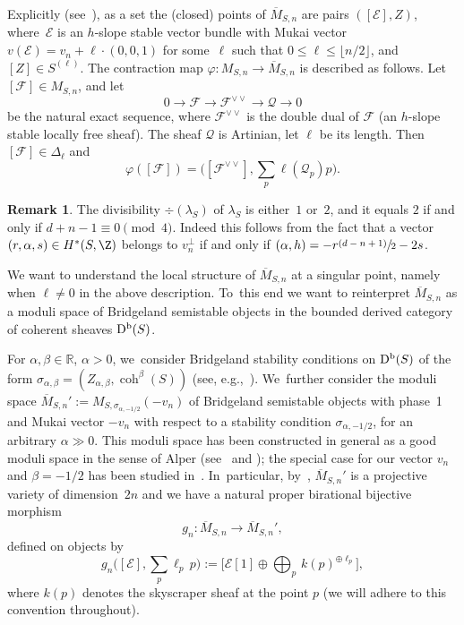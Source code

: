 \documentclass[JEP,XML,SOM,Unicode,published]{cedram}
\newcommand{\psfrac}[2]{\sfrac{(#1)}{#2}}
\newcommand{\RR}{{\mathbb R}}
\newcommand\cE{\mathcal{E}}
\newcommand\cF{\mathcal{F}}
\newcommand\cQ{\mathcal{Q}}
\DeclareMathOperator{\coh}{coh}
\DeclareMathOperator{\Db}{D^{\textup b}}
\let\phi\varphi
\theoremstyle{definition}
\newtheorem{rema}[lemm]{Remark}
\begin{document}
Explicitly (see~\cite{Li:uhlencomp}), as a set the (closed) points of $\overline{M}_{S,n}$ are pairs $([\cE],Z)$, where~$\cE$ is an $h$-slope stable vector bundle with Mukai vector $v(\cE)=v_n+\ell\cdot(0,0,1)$ for some~$\ell$ such that $0\le \ell\le \lfloor n/2\rfloor$, and $[Z]\in S^{(\ell)}$.
The contraction map $\phi\colon M_{S,n}\to \overline{M}_{S,n}$ is described as follows.
Let $[\cF]\in M_{S,n}$, and let
\[
0\to \cF\to \cF^{\vee\vee}\to \cQ\to 0
\]
be the natural exact sequence, where $\cF^{\vee\vee}$ is the double dual of $\cF$ (an $h$-slope stable locally free sheaf).
The sheaf $\cQ$ is Artinian, let $\ell$ be its length.
Then $[\cF]\in\Delta_{\ell}$ and
\[\textstyle
\varphi([\cF])=\bigl([\cF^{\vee\vee}],\sum_{p}\ell(\cQ_p)p\bigr).
\]

\begin{rema}\label{rmk:divisibility}
The divisibility $\div(\lambda_S)$ of $\lambda_S$ is either~$1$ or~$2$, and it equals $2$ if and only if $d+n-1\equiv 0 \pmod 4$.
Indeed this follows from the fact that a vector $(r,\alpha,s)\in H^*(S,\Z)$ belongs to $v_n^\perp$ if and only if $(\alpha,h)=-r\psfrac{d-n+1}{2}-2s$.
\end{rema}

We want to understand the local structure of $\overline{M}_{S,n}$ at a singular point, namely when $\ell\neq0$ in the above description. To~this end we want to reinterpret $\overline{M}_{S,n}$ as a moduli space of Bridgeland semistable objects in the bounded derived category of coherent sheaves $\Db(S)$.

For $\alpha,\beta\in\RR$, $\alpha>0$, we~consider Bridgeland stability conditions on $\Db(S)$ of the form $\sigma_{\alpha,\beta}=(Z_{\alpha,\beta},\coh^\beta(S))$ (see, e.g.,~\cite[Ex.\,3.7]{involutions1}). We~further consider the moduli space $\overline{M}{}_{S,n}':=M_{S,\sigma_{\alpha,-1/2}}(-v_n)$ of Bridgeland semistable objects with phase~1 and Mukai vector $-v_n$ with respect to a stability condition $\sigma_{\alpha,-1/2}$, for an arbitrary $\alpha\gg 0$.
This moduli space has been constructed in general as a good moduli space in the sense of Alper (see~\cite{Alper:GoodModuli,AHLH:Moduli} and \cite[Th.\,21.24]{BLMNPS:family}); the special case for our vector $v_n$ and $\beta=-1/2$ has been studied in~\cite{Tajakka:Uhlenbeck}. In~particular, by~\cite[Th.\,1.1]{Tajakka:Uhlenbeck}, $\overline{M}{}_{S,n}'$ is a projective variety of dimension~$2n$ and we have a natural proper birational bijective morphism
\[
g_n\colon \overline{M}_{S,n} \to \overline{M}{}_{S,n}',
\]
defined on objects by
\begin{equation}\label{eq:GiesekerToDUY}\textstyle
g_n\bigl([\cE],\sum_p \ell_p\, p\bigr):=\bigl[\cE[1]\oplus \bigoplus_p\, k(p)^{\oplus \ell_p}\bigr],
\end{equation}
where $k(p)$ denotes the skyscraper sheaf at the point $p$ (we will adhere to this convention throughout).
\end{document}
